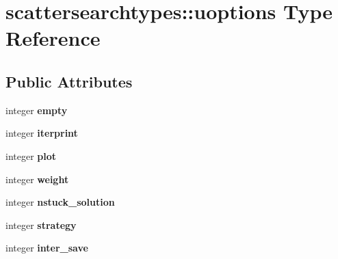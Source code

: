 \hypertarget{structscattersearchtypes_1_1uoptions}{\section{scattersearchtypes\-:\-:uoptions Type Reference}
\label{structscattersearchtypes_1_1uoptions}
}
\subsection*{Public Attributes}
\begin{DoxyCompactItemize}
\item 
\hypertarget{structscattersearchtypes_1_1uoptions_af747ad99a313f3d9b7dfd3ccea6f775b}{integer {\bfseries empty}}\label{structscattersearchtypes_1_1uoptions_af747ad99a313f3d9b7dfd3ccea6f775b}

\item 
\hypertarget{structscattersearchtypes_1_1uoptions_a180f16eb76bbd416cedf3af06e080706}{integer {\bfseries iterprint}}\label{structscattersearchtypes_1_1uoptions_a180f16eb76bbd416cedf3af06e080706}

\item 
\hypertarget{structscattersearchtypes_1_1uoptions_a9cfa61bac7621f728793f2e6ffdb57a6}{integer {\bfseries plot}}\label{structscattersearchtypes_1_1uoptions_a9cfa61bac7621f728793f2e6ffdb57a6}

\item 
\hypertarget{structscattersearchtypes_1_1uoptions_ac1bc5210ba4caf49a5532b2910a952d7}{integer {\bfseries weight}}\label{structscattersearchtypes_1_1uoptions_ac1bc5210ba4caf49a5532b2910a952d7}

\item 
\hypertarget{structscattersearchtypes_1_1uoptions_a80e2be5545f4faa8d54b22e4f8177ec0}{integer {\bfseries nstuck\-\_\-solution}}\label{structscattersearchtypes_1_1uoptions_a80e2be5545f4faa8d54b22e4f8177ec0}

\item 
\hypertarget{structscattersearchtypes_1_1uoptions_ac7aecc03b9d5a623da73868ea19f0ce4}{integer {\bfseries strategy}}\label{structscattersearchtypes_1_1uoptions_ac7aecc03b9d5a623da73868ea19f0ce4}

\item 
\hypertarget{structscattersearchtypes_1_1uoptions_a89a6811bd6e60ac7849a5d1ae28b2815}{integer {\bfseries inter\-\_\-save}}\label{structscattersearchtypes_1_1uoptions_a89a6811bd6e60ac7849a5d1ae28b2815}


\end{DoxyCompactItemize}
